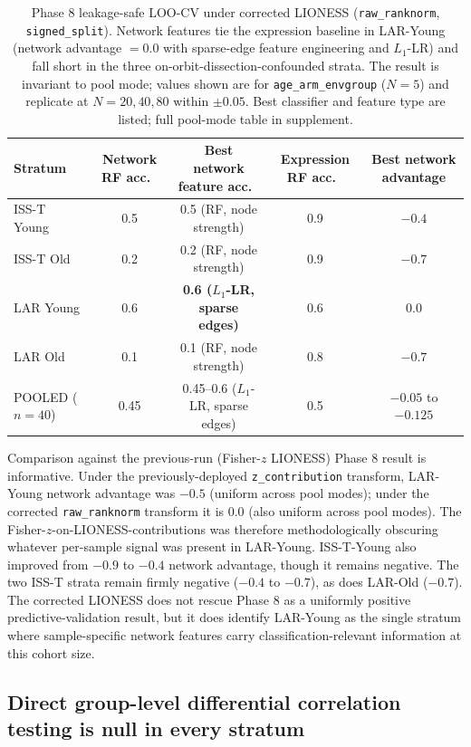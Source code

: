 \documentclass[11pt]{article}
\newcommand{\code}[1]{\texttt{#1}}
\begin{document}
\begin{table}[h]
\centering\small
\begin{tabular}{lcccc}
\toprule
Stratum & Network RF acc.\ & Best network feature acc.\ & Expression RF acc.\ & Best network advantage \\
\midrule
ISS-T Young & 0.5 & 0.5 (RF, node strength) & 0.9 & $-0.4$ \\
ISS-T Old & 0.2 & 0.2 (RF, node strength) & 0.9 & $-0.7$ \\
LAR Young & 0.6 & \textbf{0.6 ($L_1$-LR, sparse edges)} & 0.6 & $\mathbf{0.0}$ \\
LAR Old & 0.1 & 0.1 (RF, node strength) & 0.8 & $-0.7$ \\
POOLED ($n{=}40$) & 0.45 & 0.45--0.6 ($L_1$-LR, sparse edges) & 0.5 & $-0.05$ to $-0.125$ \\
\bottomrule
\end{tabular}
\caption{Phase 8 leakage-safe LOO-CV under corrected LIONESS (\code{raw\_ranknorm}, \code{signed\_split}). Network features tie the expression baseline in LAR-Young (network advantage $= 0.0$ with sparse-edge feature engineering and $L_1$-LR) and fall short in the three on-orbit-dissection-confounded strata. The result is invariant to pool mode; values shown are for \code{age\_arm\_envgroup} ($N{=}5$) and replicate at $N{=}20, 40, 80$ within $\pm 0.05$. Best classifier and feature type are listed; full pool-mode table in supplement.}
\label{tab:phase8}
\end{table}

Comparison against the previous-run (Fisher-$z$ LIONESS) Phase 8 result is informative. Under the previously-deployed \code{z\_contribution} transform, LAR-Young network advantage was $-0.5$ (uniform across pool modes); under the corrected \code{raw\_ranknorm} transform it is $0.0$ (also uniform across pool modes). The Fisher-$z$-on-LIONESS-contributions was therefore methodologically obscuring whatever per-sample signal was present in LAR-Young. ISS-T-Young also improved from $-0.9$ to $-0.4$ network advantage, though it remains negative. The two ISS-T strata remain firmly negative ($-0.4$ to $-0.7$), as does LAR-Old ($-0.7$). The corrected LIONESS does not rescue Phase 8 as a uniformly positive predictive-validation result, but it does identify LAR-Young as the single stratum where sample-specific network features carry classification-relevant information at this cohort size.

\subsection{Direct group-level differential correlation testing is null in every stratum}
\end{document}
